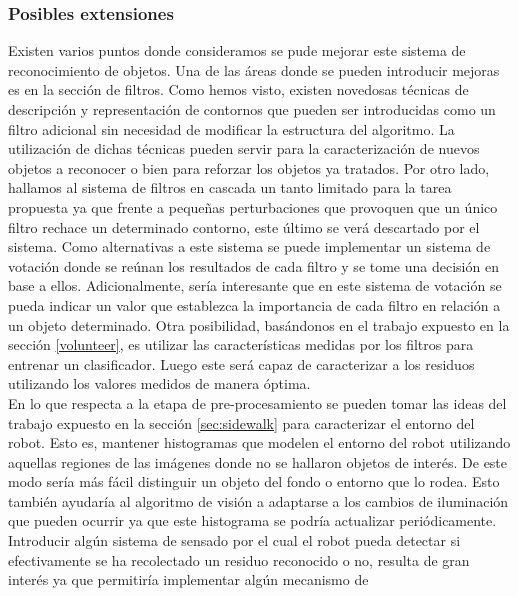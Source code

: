 \subsubsection{Posibles extensiones}
Existen varios puntos donde consideramos se pude mejorar este sistema 
de reconocimiento de objetos. Una de las \'areas donde se pueden introducir mejoras es en 
la secci\'on de filtros. Como hemos visto, existen novedosas t\'ecnicas de 
descripci\'on y representaci\'on de contornos que pueden ser introducidas 
como un filtro adicional sin necesidad de modificar la estructura del 
algoritmo. La utilizaci\'on de dichas t\'ecnicas pueden servir para 
la caracterizaci\'on de nuevos objetos a reconocer o bien para reforzar 
los objetos ya tratados. Por otro lado, hallamos al sistema de filtros 
en cascada un tanto limitado para la tarea propuesta ya que frente a 
peque\~nas perturbaciones que provoquen que un \'unico filtro rechace un 
determinado contorno, este \'ultimo se ver\'a descartado por el sistema. 
Como alternativas a este sistema se puede implementar un sistema de 
votaci\'on donde se re\'unan los resultados de cada filtro y se tome una 
decisi\'on en base a ellos. Adicionalmente, ser\'ia interesante que en 
este sistema de votaci\'on se pueda indicar un valor que establezca la 
importancia de cada filtro en relaci\'on a un objeto determinado. Otra 
posibilidad, bas\'andonos en el trabajo \cite{potato} expuesto en la 
secci\'on \ref{volunteer}, es utilizar las 
caracter\'isticas medidas por los filtros para entrenar un clasificador. 
Luego este ser\'a capaz de caracterizar a los residuos utilizando los 
valores medidos de manera \'optima.\\
\indent En lo que respecta a la etapa de pre-procesamiento se pueden 
tomar las ideas del trabajo \cite{sidewalk2008} expuesto en la secci\'on \ref{sec:sidewalk} 
para caracterizar el entorno del robot. Esto es, mantener histogramas 
que modelen el entorno del robot utilizando aquellas regiones de las 
im\'agenes donde no se hallaron  objetos de inter\'es. De este modo ser\'ia m\'as f\'acil 
distinguir un objeto del fondo o entorno que lo rodea. Esto tambi\'en 
ayudar\'ia al algoritmo de visi\'on a adaptarse a los cambios de 
iluminaci\'on que pueden ocurrir ya que este histograma se podr\'ia 
actualizar peri\'odicamente.\\
\indent Introducir alg\'un sistema de sensado por el cual el robot pueda 
detectar si efectivamente se ha recolectado un residuo reconocido o no, resulta de 
gran inter\'es ya que permitir\'ia implementar alg\'un mecanismo de 
